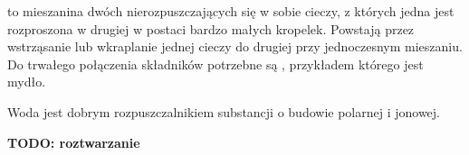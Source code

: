  to mieszanina dwóch nierozpuszczających się w sobie cieczy, z których jedna jest rozproszona w drugiej w postaci bardzo małych kropelek.
Powstają przez wstrząsanie lub wkraplanie jednej cieczy do drugiej przy jednoczesnym mieszaniu.
Do trwałego połączenia składników potrzebne są , przykładem którego jest mydło.

Woda jest dobrym rozpuszczalnikiem substancji o budowie polarnej i jonowej.

\textbf{TODO: roztwarzanie}





